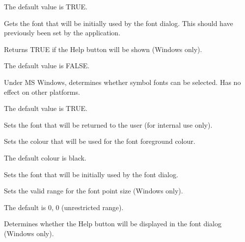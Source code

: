 The default value is TRUE.



Gets the font that will be initially used by the font dialog. This should have
previously been set by the application.



Returns TRUE if the Help button will be shown (Windows only).

The default value is FALSE.



Under MS Windows, determines whether symbol fonts can be selected. Has no
effect on other platforms.

The default value is TRUE.



Sets the font that will be returned to the user (for internal use only).



Sets the colour that will be used for the font foreground colour.

The default colour is black.



Sets the font that will be initially used by the font dialog.



Sets the valid range for the font point size (Windows only).

The default is 0, 0 (unrestricted range).



Determines whether the Help button will be displayed in the font dialog (Windows only).

